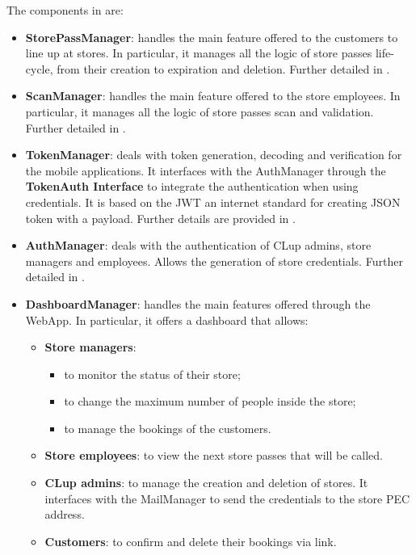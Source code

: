 The components in  are:
\begin{itemize}
	\item \textbf{StorePassManager}: handles the main feature offered to the customers to line up at stores. In particular, it manages all the logic of store passes life-cycle, from their creation to expiration and deletion. Further detailed in .
	
	\item \textbf{ScanManager}: handles the main feature offered to the store employees. In particular, it manages all the logic of store passes scan and validation. Further detailed in .
	
	\item \textbf{TokenManager}: deals with token generation, decoding and verification for the mobile applications. It interfaces with the AuthManager through the \textbf{TokenAuth Interface} to integrate the authentication when using credentials. It is based on the JWT an internet standard for creating JSON token with a payload. Further details are provided in .
	
	\item \textbf{AuthManager}: deals with the authentication of CLup admins, store managers and employees. Allows the generation of store credentials. Further detailed in .
	
	\item \textbf{DashboardManager}: handles the main features offered through the WebApp. In particular, it offers a dashboard that allows:
	\begin{itemize}
		\item \textbf{Store managers}:
				\begin{itemize}
					\item to monitor the status of their store;
					\item to change the maximum number of people inside the store;
					\item to manage the bookings of the customers.
				\end{itemize}
			
		\item \textbf{Store employees}: to view the next store passes that will be called.
		\item \textbf{CLup admins}: to manage the creation and deletion of stores. It interfaces with the MailManager to send the credentials to the store PEC address.
		\item \textbf{Customers}: to confirm and delete their bookings via link.
	\end{itemize}
	

\end{itemize}
